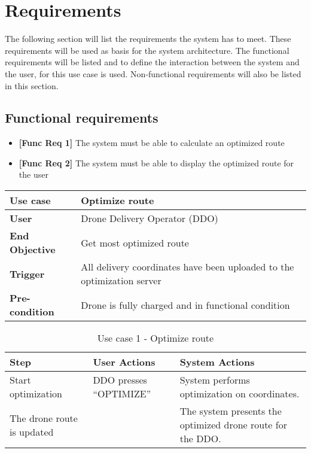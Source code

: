 
\chapter{Requirements}

The following section will list the requirements the system has to meet. These requirements will be used as basis for the system architecture. The functional requirements will be listed and to define the interaction between the system and the user, for this use case is used. Non-functional requirements will also be listed in this section. 

\section{Functional requirements}
\begin{itemize}
	\item \textbf{[Func Req 1]} The system must be able to calculate an optimized route
	\item \textbf{[Func Req 2]} The system must be able to display the optimized route for the user
\end{itemize}

\begin{table}[H]
	\begin{tabular}{|l|l|}
		\hline
		\cellcolor[HTML]{EFEFEF} \textbf{Use case}  & \cellcolor[HTML]{EFEFEF} \textbf{Optimize route}\\ \hline
		\cellcolor[HTML]{EFEFEF} \textbf{User} &  Drone Delivery Operator (DDO) \\ \hline
		\cellcolor[HTML]{EFEFEF} \textbf{End Objective} &  Get most optimized route\\ \hline
		\cellcolor[HTML]{EFEFEF} \textbf{Trigger} & All delivery coordinates have been uploaded to the optimization server \\ \hline 
		\cellcolor[HTML]{EFEFEF} \textbf{Pre-condition} & Drone is fully charged and in functional condition \\ \hline
	\end{tabular}
\end{table}


\begin{table}[H]
	\centering
	
	\label{Use_case_1_optimize_route}
	
	\begin{tabular}{|p{2cm}|p{5cm}|p{5cm}|}
		\hline
		\cellcolor[HTML]{EFEFEF} \textbf{Step} & \cellcolor[HTML]{EFEFEF} \textbf{User Actions}  & \cellcolor[HTML]{EFEFEF} \textbf{System Actions} \\ \hline
		\cellcolor[HTML]{EFEFEF} Start optimization &  DDO presses “OPTIMIZE”  & System performs optimization on coordinates. \\ \hline
		\cellcolor[HTML]{EFEFEF} The drone route is updated   &     &  The system presents the optimized drone route for the DDO.  \\ \hline
		
	\end{tabular}
	\caption{Use case 1 - Optimize route}
\end{table}


